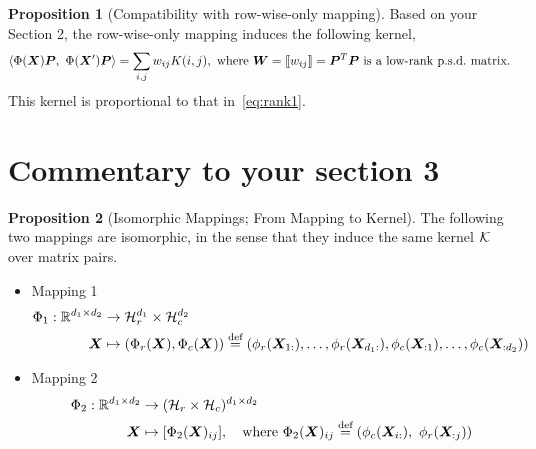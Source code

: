 \documentclass[11pt]{article}
\theoremstyle{plain}
\theoremstyle{definition}
\newtheorem{prop}{Proposition}
\begin{document}
\begin{prop}[Compatibility with row-wise-only mapping]
Based on your Section 2, the row-wise-only mapping induces the following kernel,
\[
\langle \Phi(\mX)\mP,\ \Phi(\mX')\mP\rangle = \sum_{i,j}w_{ij}K(i,j), \text{ where }\mW=\entry{w_{ij}}=\mP^T\mP \text{ is a low-rank p.s.d.\ matrix.}
\]
This kernel is proportional to that in~\eqref{eq:rank1}.
\end{prop}

\section{Commentary to your section 3}
\begin{prop}[Isomorphic Mappings; From Mapping to Kernel]
The following two mappings are isomorphic, in the sense that they induce the same kernel $\mathcal{K}$ over matrix pairs. 
\begin{itemize}
\item Mapping 1
\begin{align}
\Phi_1: \mathbb{R}^{d_1\times d_2}& \to \mathcal{H}_r^{d_1}\times \mathcal{H}_c^{d_2} \\
\bm X& \mapsto (\Phi_r(\bm X),\Phi_c(\bm X))\stackrel{\text{def}}{= }(\phi_r(\bm X_{1:}),\ldots,\phi_r(\bm X_{d_1:}), \phi_c(\bm X_{:1}),\ldots,\phi_c(\bm X_{:d_2}))
\end{align}
\item Mapping 2
\begin{align}
\Phi_2: \mathbb{R}^{d_1\times d_2}& \to (\tH_r\times \tH_c)^{d_1\times d_2}\\
\mX& \mapsto [\Phi_2(\mX)_{ij}],\quad \text{where}\ \Phi_2(\mX)_{ij}\stackrel{\text{def}}{=}(\phi_c(\mX_{i:}),\ \phi_r(\mX_{:j}))
\end{align}
\end{itemize}
\end{prop}
\end{document}

